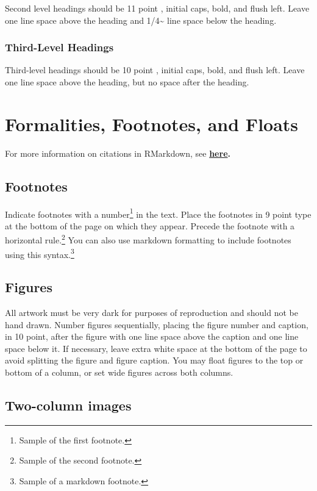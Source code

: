 \documentclass[10pt, letterpaper]{article}
\begin{document}
Second level headings should be 11 point , initial caps, bold, and flush
left. Leave one line space above the heading and 1/4\textasciitilde{}
line space below the heading.

\subsubsection{Third-Level Headings}\label{third-level-headings}

Third-level headings should be 10 point , initial caps, bold, and flush
left. Leave one line space above the heading, but no space after the
heading.

\section{Formalities, Footnotes, and
Floats}\label{formalities-footnotes-and-floats}

For more information on citations in RMarkdown, see
\textbf{\href{http://rmarkdown.rstudio.com/authoring_bibliographies_and_citations.html\#citations}{here}.}

\subsection{Footnotes}\label{footnotes}

Indicate footnotes with a number\footnote{Sample of the first
footnote.} in the text. Place the footnotes in 9 point type at the
bottom of the page on which they appear. Precede the footnote with a
horizontal rule.\footnote{Sample of the second footnote.} You can also
use markdown formatting to include footnotes using this
syntax.\footnote{Sample of a markdown footnote.}

\subsection{Figures}\label{figures}

All artwork must be very dark for purposes of reproduction and should
not be hand drawn. Number figures sequentially, placing the figure
number and caption, in 10 point, after the figure with one line space
above the caption and one line space below it. If necessary, leave extra
white space at the bottom of the page to avoid splitting the figure and
figure caption. You may float figures to the top or bottom of a column,
or set wide figures across both columns.

\subsection{Two-column images}\label{two-column-images}
\end{document}
